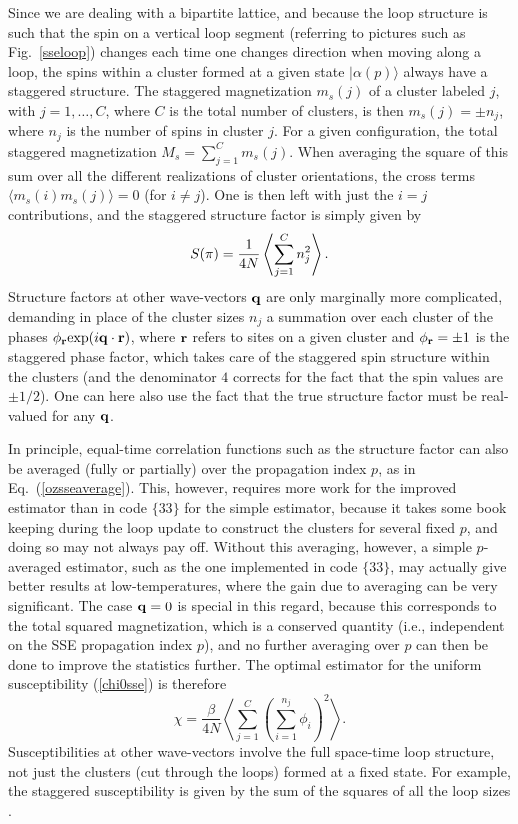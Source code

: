 \documentclass[draft,numberedheadings]{aipproc}
\begin{document}
Since we are dealing with a bipartite lattice, and because the loop structure is such that the spin on a vertical loop segment (referring to pictures
such as Fig.~\ref{sseloop}) changes each time one changes direction when moving along a loop, the spins within a cluster formed at a given state
$|\alpha(p)\rangle$ always have a staggered structure. The staggered magnetization $m_s(j)$ of a cluster labeled $j$, with $j=1,\ldots,C$, where $C$ is 
the total number of clusters, is then $m_s(j)=\pm n_j$, where $n_j$ is the number of spins in cluster $j$. For a given configuration, the total staggered 
magnetization $M_s=\sum_{j=1}^{C} m_s(j)$. When averaging the square of this sum over all the different realizations of cluster orientations, the cross 
terms $\langle m_s(i)m_s(j)\rangle=0$ (for $i \not =j$). One is then left with just the $i=j$ contributions, and the staggered structure 
factor is simply given by
\begin{equation}
S({\bf \pi}) = \frac{1}{4N}\left \langle \sum_{j=1}^{C} n_j^2 \right \rangle.
\end{equation}
Structure factors at other wave-vectors ${\bf q}$ are only marginally more complicated, demanding in place of the cluster sizes $n_j$ a summation 
over each cluster of the phases $\phi_{\bf r} {\rm exp}(i{\bf q}\cdot {\bf r})$, where ${\bf r}$ refers to sites on a given cluster and $\phi_{\bf r}=\pm 1$ 
is the staggered phase factor, which takes care of the staggered spin structure within the clusters (and the denominator $4$ corrects for the fact that 
the spin values are $\pm 1/2$). One can here also use the fact that the true structure factor must be real-valued for any ${\bf q}$.

In principle, equal-time correlation functions such as the structure factor can also be averaged (fully or partially) over the propagation index $p$, 
as in Eq.~(\ref{ozsseaverage}). This, however, requires more work for the improved estimator than in code $\{33\}$ for the simple estimator, because 
it takes some book keeping during the loop update to construct the clusters for several fixed $p$, and doing so may not always pay off.
Without this averaging, however, a simple $p$-averaged estimator, such as the one implemented in code $\{33\}$, may actually give better results at 
low-temperatures, where the gain due to averaging can be very significant. The case ${\bf q}=0$ is special in this regard, because this corresponds to 
the total squared magnetization, which is a conserved quantity (i.e., independent on the SSE propagation index $p$), and no further averaging 
over $p$ can then be done to improve the statistics further. The optimal estimator for the uniform susceptibility (\ref{chi0sse}) is therefore
\begin{equation}
\chi = \frac{\beta}{4N}\left \langle \sum_{j=1}^C \left ( \sum_{i=1}^{n_j}\phi_i \right )^2 \right \rangle.
\label{chiloopestim}
\end{equation}
Susceptibilities at other wave-vectors involve the full space-time loop structure, not just the clusters (cut through the loops) formed at
a fixed state. For example, the staggered susceptibility is given by the sum of the squares of all the loop sizes \cite{evertz1}.
\end{document}
